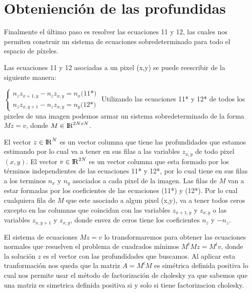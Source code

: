 \section{Obteniención de las profundidas}	

Finalmente el último paso es resolver las ecuaciones 11 y 12, las cuales nos permiten construir un sistema de ecuaciones sobredeterminado para todo el espacio de píxeles.\par
Las ecuaciones 11 y 12 asociadas a un pixel (x,y) se puede reescribir de la siguiente manera:\par
$\begin{cases}
n_{z} z_{x+1,y} - n_{z} z_{x,y}= n_{x} \text{(11*)}\\
n_{z} z_{x,y+1} - n_{z} z_{x,y}= n_{y} \text{(12*)}
\end{cases}$
\break
\indent Utilizando las ecuaciones 11* y 12* de todos los pixeles de una imagen podemos armar un sistema sobredeterminado de la forma $Mz=v$, donde $M \in {\rm I\!R}^{2NxN}$. \par
\indent El vector $z \in {\rm I\!R}^{N}$ es un vector columna que tiene las profundidades que estamos estimando por lo cual va a tener en sus filas a las variables $z_{x,y}$ de todo pixel $(x,y)$. El vector $v \in {\rm I\!R}^{2N}$ es un vector columna que esta formado por los términos independientes de las ecuaciones 11* y 12*, por lo cual tiene en sus filas a los terminos $n_{x}$ y $n_{y}$ asociados a cada pixel de la imagen. Las filas de $M$ van a estar formadas por los coeficientes de las ecuaciones (11*) y (12*). Por lo cual cualquiera fila de $M$ que este asociado a algun pixel (x,y), va a tener todos ceros excepto en las columnas que coincidan con las variables $z_{x+1,y}$ y $z_{x,y}$ o las variables  $z_{x,y+1}$ y $z_{x,y}$, donde envez de ceros tiene los coeficientes $n_{z}$ y $-n_{z}$.\par 
\indent El sistema de ecuaciones $Mz=v$ lo transformaremos para obtener las ecuaciones normales que resuelven el problema de cuadrados mínimos $M^{t}Mz=M^{t}v$, donde la solución $z$ es el vector con las profundidades que buscamos. Al aplicar esta tranformación nos queda que la matriz $A= M^{t}M$ es simétrica definida positiva lo cual nos permite usar el método de factorización de cholesky ya que sabemos que una matriz es simetrica definida positiva si y solo si tiene factorizacion cholesky.\par


